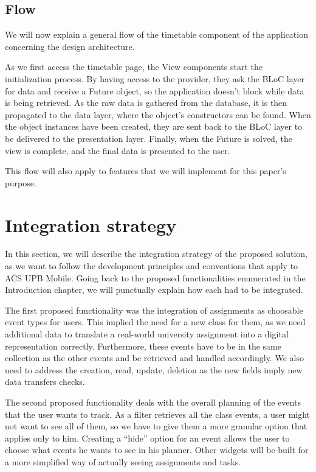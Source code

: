 \subsection{Flow} \label{4:app:flow}
We will now explain a general flow of the timetable component of the application concerning the design architecture. 
 	
 As we first access the timetable page, the View components start the initialization process. By having access to the provider, they ask the BLoC layer for data and receive a Future object, so the application doesn’t block while data is being retrieved. As the raw data is gathered from the database, it is then propagated to the data layer, where the object’s constructors can be found. When the object instances have been created, they are sent back to the BLoC layer to be delivered to the presentation layer. Finally, when the Future is solved, the view is complete, and the final data is presented to the user. 
	
This flow will also apply to features that we will implement for this paper’s purpose. 

\section{Integration strategy} \label{4:strategy}

In this section, we will describe the integration strategy of the proposed solution, as we want to follow the development principles and conventions that apply to ACS UPB Mobile. 
Going back to the proposed functionalities enumerated in the Introduction chapter, we will punctually explain how each had to be integrated.

The first proposed functionality was the integration of assignments as choosable event types for users. This implied the need for a new class for them, as we need additional data to translate a real-world university assignment into a digital representation correctly. Furthermore, these events have to be in the same collection as the other events and be retrieved and handled accordingly. We also need to address the creation, read, update, deletion as the new fields imply new data transfers checks.

The second proposed functionality deals with the overall planning of the events that the user wants to track. As a filter retrieves all the class events, a user might not want to see all of them, so we have to give them a more granular option that applies only to him. Creating a “hide” option for an event allows the user to choose what events he wants to see in his planner. Other widgets will be built for a more simplified way of actually seeing assignments and tasks.

